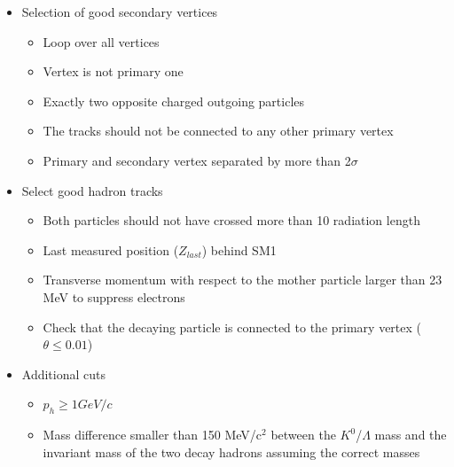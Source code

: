 \begin{itemize}
  \item Selection of good secondary vertices
  \begin{itemize}
    \item Loop over all vertices
    \item Vertex is not primary one
    \item Exactly two opposite charged outgoing particles
    \item The tracks should not be connected to any other primary vertex
    \item Primary and secondary vertex separated by more than 2$\sigma$
  \end{itemize}
  \item Select good hadron tracks
  \begin{itemize}
    \item Both particles should not have crossed more than 10 radiation length
    \item Last measured position ($Z_{last}$) behind SM1
    \item Transverse momentum with respect to the mother particle larger than 23 MeV to suppress electrons
    \item Check that the decaying particle is connected to the primary vertex ($\theta \le 0.01$)
  \end{itemize}
  \item Additional cuts
  \begin{itemize}
    \item $p_h \geq 1 GeV/c$
    \item Mass difference smaller than 150 MeV/c$^2$ between the $K^0$/$\Lambda$ mass and the invariant mass of the two decay hadrons assuming the correct masses
  \end{itemize}
\end{itemize}

